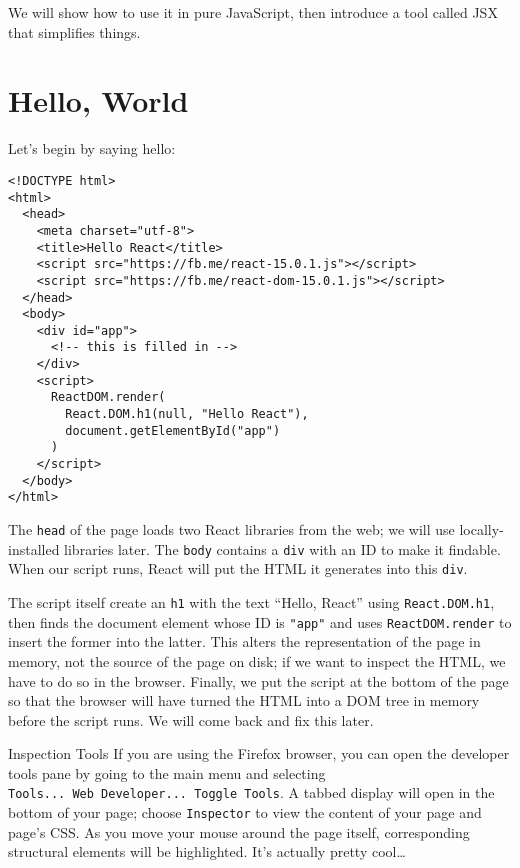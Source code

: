 We will show how to use it in pure JavaScript,
then introduce a tool called JSX that simplifies things.

\section{Hello, World}\label{s:dynamic-hello}

Let's begin by saying hello:

\begin{verbatim}
<!DOCTYPE html>
<html>
  <head>
    <meta charset="utf-8">
    <title>Hello React</title>
    <script src="https://fb.me/react-15.0.1.js"></script>
    <script src="https://fb.me/react-dom-15.0.1.js"></script>
  </head>
  <body>
    <div id="app">
      <!-- this is filled in -->
    </div>
    <script>
      ReactDOM.render(
        React.DOM.h1(null, "Hello React"),
        document.getElementById("app")
      )
    </script>
  </body>
</html>
\end{verbatim}

The \texttt{head} of the page loads two React libraries from the web;
we will use locally-installed libraries later.
The \texttt{body} contains a \texttt{div} with an ID to make it findable.
When our script runs,
React will put the HTML it generates into this \texttt{div}.

The script itself create an \texttt{h1} with the text ``Hello, React'' using \texttt{React.DOM.h1},
then finds the document element whose ID is \texttt{"app"}
and uses \texttt{ReactDOM.render} to insert the former into the latter.
This alters the representation of the page in memory,
not the source of the page on disk;
if we want to inspect the HTML,
we have to do so in the browser.
Finally,
we put the script at the bottom of the page
so that the browser will have turned the HTML into a DOM tree in memory
before the script runs.
We will come back and fix this later.

\begin{aside}{Inspection Tools}
  If you are using the Firefox browser,
  you can open the developer tools pane by going to the main menu
  and selecting \texttt{Tools...\ Web\ Developer...\ Toggle\ Tools}.
  A tabbed display will open in the bottom of your page;
  choose \texttt{Inspector} to view the content of your page and page's CSS.
  As you move your mouse around the page itself,
  corresponding structural elements will be highlighted.
  It's actually pretty cool\ldots{}
\end{aside}

